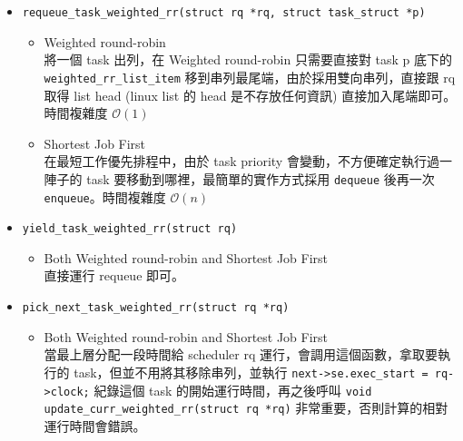 \documentclass{res}
\begin{document}
\begin{resume}
\begin{itemize}
	\item
	\lstinline{requeue_task_weighted_rr(struct rq *rq, struct task_struct *p)} \\
	\begin{itemize}
		\item Weighted round-robin \\
		將一個 task 出列，在 Weighted round-robin 只需要直接對 task p 底下的 \lstinline{weighted_rr_list_item} 移到串列最尾端，由於採用雙向串列，直接跟 rq 取得 list head (linux list 的 head 是不存放任何資訊) 直接加入尾端即可。時間複雜度 $\mathcal{O}(1)$
		\item Shortest Job First \\
		在最短工作優先排程中，由於 task priority 會變動，不方便確定執行過一陣子的 task 要移動到哪裡，最簡單的實作方式採用 \lstinline{dequeue} 後再一次 \lstinline{enqueue}。時間複雜度 $\mathcal{O}(n)$
	\end{itemize}
	
	\item
	\lstinline{yield_task_weighted_rr(struct rq)} \\
	\begin{itemize}
		\item Both Weighted round-robin and Shortest Job First\\
		直接運行 requeue 即可。
	\end{itemize}
	
	\item
	\lstinline{pick_next_task_weighted_rr(struct rq *rq)}\\
	\begin{itemize}
		\item Both Weighted round-robin and Shortest Job First\\
		當最上層分配一段時間給 scheduler rq 運行，會調用這個函數，拿取要執行的 task，但並不用將其移除串列，並執行  \lstinline{next->se.exec_start = rq->clock;} 紀錄這個 task 的開始運行時間，再之後呼叫 \lstinline {void update_curr_weighted_rr(struct rq *rq)} 非常重要，否則計算的相對運行時間會錯誤。
	\end{itemize}
	

\end{itemize}
\end{resume}
\end{document}
